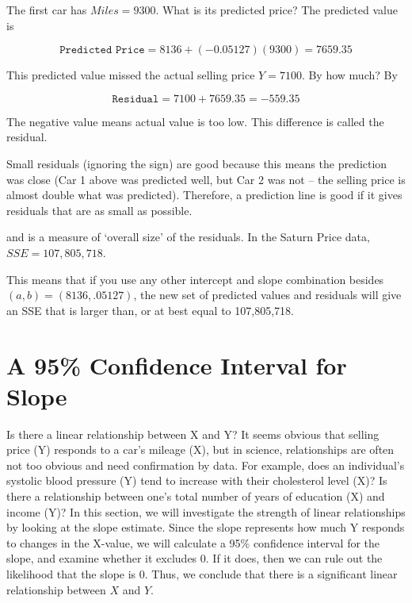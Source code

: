 \documentclass[11pt, chapterprefix=true]{scrbook}\usepackage[]{graphicx}\usepackage[]{color}
\begin{document}
The first car has $Miles = 9300$.  What is its predicted price?  The predicted value is 

\begin{equation*}
  \texttt{Predicted Price} = 8136 + (-0.05127)(9300) = 7659.35
\end{equation*}

This predicted value missed the actual selling price $Y = 7100$.  By how much? By

\begin{equation*}
  \texttt{Residual} = 7100 + 7659.35 = -559.35
\end{equation*}

The negative value means actual value is too low.  This difference is called the residual.  

Small residuals (ignoring the sign) are good because this means the prediction was close  (Car 1 above was predicted well, but Car 2 was not -- the selling price is almost double what was predicted).  Therefore, a prediction line is good if it gives residuals that are as small as possible.  

\begin{center}
\end{center}

and is a measure of `overall size' of the residuals.  In the Saturn Price data, \\
$SSE =  107,805,718$.

\begin{center}
\end{center}

This means that if you use any other intercept and slope combination besides $(a,b) = (8136,.05127)$, the new set of predicted values and residuals will give an SSE that is larger than, or at best equal to 107,805,718. 

\section{A 95\% Confidence Interval for Slope}

Is there a linear relationship between X and Y?  It seems obvious that selling price (Y) responds to a car's mileage (X), but in science, relationships are often not too obvious and need confirmation by data.  For example, does an individual's systolic blood pressure (Y) tend to increase with their cholesterol level (X)?   Is there a relationship between one's total number of years of education (X) and income (Y)?  In this section, we will investigate the strength of linear relationships by looking at the slope estimate.  Since the slope represents how much Y responds to changes in the X-value, we will calculate a 95\% confidence interval for the slope, and examine whether it excludes 0.  If it does, then we can rule out the likelihood that the slope is 0.  Thus, we conclude that there is a significant linear relationship between $X$ and $Y$.
\end{document}
